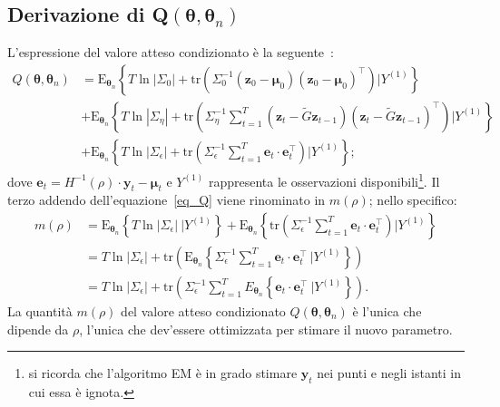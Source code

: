 \subsection[Derivazione di Q$(\boldsymbol{\theta}, \boldsymbol{\theta}_n)$]{Derivazione di Q$(\boldsymbol{\theta}, \boldsymbol{\theta}_n)$}
L'espressione del valore atteso condizionato è la seguente~\citep{paper_GRASPA}:
\begin{equation}
	\begin{split}
		Q(\boldsymbol{\theta},\boldsymbol{\theta}_n) & = \text{E}_{\boldsymbol{\theta}_n}\left\{T\ln|\Sigma_0| + \text{tr}\left(\Sigma_0^{-1}\left(\mathbf{z}_0 - \boldsymbol{\mu}_0\right)\left(\mathbf{z}_0 - \boldsymbol{\mu}_0\right)^\top\right)\bigg| Y^{(1)}\right\} \\
		& + \text{E}_{\boldsymbol{\theta}_n}\left\{T\ln|\Sigma_\eta| + \text{tr}\left(\Sigma_\eta^{-1}\sum_{t=1}^{T}\left(\mathbf{z}_t - \tilde{G}\mathbf{z}_{t-1}\right)\left(\mathbf{z}_t - \tilde{G}\mathbf{z}_{t-1}\right)^\top\right)\bigg| Y^{(1)}\right\} \\
		& + \text{E}_{\boldsymbol{\theta}_n}\left\{T\ln|\Sigma_\epsilon| + \text{tr}\left(\Sigma_\epsilon^{-1}\sum_{t=1}^{T}\mathbf{e}_t\cdot\mathbf{e}_t^\top\right)\bigg| Y^{(1)}\right\};
	\end{split}
	\label{eq_Q}
\end{equation}
dove $\mathbf{e}_t = H^{-1}(\rho)\cdot\mathbf{y}_t - \boldsymbol{\mu}_t$ e $Y^{(1)}$ rappresenta le osservazioni disponibili\footnote{si ricorda che l'algoritmo EM è in grado stimare $\mathbf{y}_t$ nei punti e negli istanti in cui essa è ignota.}. Il terzo addendo dell'equazione~\ref{eq_Q} viene rinominato in $m(\rho)$; nello specifico:
\begin{equation}
	\begin{split}
		m(\rho) & = \text{E}_{\boldsymbol{\theta}_n}\left\{T\ln|\Sigma_\epsilon| \ \bigg|Y^{(1)}\right\} + \text{E}_{\boldsymbol{\theta}_n}\left\{\text{tr}\left(\Sigma_\epsilon^{-1}\sum_{t=1}^{T}\mathbf{e}_t\cdot\mathbf{e}_t^\top\right)\bigg|Y^{(1)}\right\} \\
		& = T\ln|\Sigma_\epsilon| + \text{tr}\left(\text{E}_{\boldsymbol{\theta}_n}\left\{\Sigma_\epsilon^{-1}\sum_{t=1}^{T}\mathbf{e}_t\cdot\mathbf{e}_t^\top \ \bigg|Y^{(1)}\right\}\right) \\
		& = T\ln|\Sigma_\epsilon| + \text{tr}\left(\Sigma_\epsilon^{-1}\sum_{t=1}^{T}E_{\boldsymbol{\theta}_n}\left\{\mathbf{e}_t\cdot\mathbf{e}_t^\top \ \bigg| Y^{(1)}\right\}\right).
	\end{split}
\label{eq_f_rho}
\end{equation}
La quantità $m(\rho)$ del valore atteso condizionato $Q(\boldsymbol{\theta}, \boldsymbol{\theta}_n)$ è l'unica che dipende da $\rho$, l'unica che dev'essere ottimizzata per stimare il nuovo parametro.

